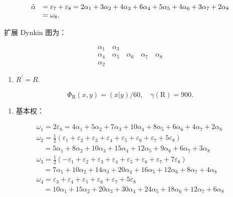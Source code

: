 \[
\begin{array}{r l} \tilde {\alpha} & = \varepsilon_ {7} + \varepsilon_ {8} = 2 \alpha_ {1} + 3 \alpha_ {2} + 4 \alpha_ {3} + 6 \alpha_ {4} + 5 \alpha_ {5} + 4 \alpha_ {6} + 3 \alpha_ {7} + 2 \alpha_ {8} \\ & = \omega_ {8}. \end{array}
\]

扩展 Dynkin 图为：

\[
\begin{array}{c} \alpha_ {1} \quad \alpha_ {3} \\ \alpha_ {4} \quad \alpha_ {5} \quad \alpha_ {6} \quad \alpha_ {7} \quad \alpha_ {8} \\ \alpha_ {2} \end{array}
\]

\begin{enumerate}
\def\labelenumi{(\Alph{enumi})}
\setcounter{enumi}{21}
\tightlist
\item
  \(R^{\prime} = R.\)
\end{enumerate}

\[
  \Phi_ {\mathrm{R}} (x, y) = (x | y) / 60, \quad \gamma (\mathrm{R}) = 900.
\]

\begin{enumerate}
\def\labelenumi{(\Roman{enumi})}
\setcounter{enumi}{5}
\tightlist
\item
  基本权：
\end{enumerate}

\[
\begin{array}{l} \omega_ {1} = 2 \varepsilon_ {8} = 4 \alpha_ {1} + 5 \alpha_ {2} + 7 \alpha_ {3} + 10 \alpha_ {4} + 8 \alpha_ {5} + 6 \alpha_ {6} + 4 \alpha_ {7} + 2 \alpha_ {8} \\ \omega_ {2} = \frac {1}{2} (\varepsilon_ {1} + \varepsilon_ {2} + \varepsilon_ {3} + \varepsilon_ {4} + \varepsilon_ {5} + \varepsilon_ {6} + \varepsilon_ {7} + 5 \varepsilon_ {8}) \\ \quad = 5 \alpha_ {1} + 8 \alpha_ {2} + 10 \alpha_ {3} + 15 \alpha_ {4} + 12 \alpha_ {5} + 9 \alpha_ {6} + 6 \alpha_ {7} + 3 \alpha_ {8} \\ \omega_ {3} = \frac {1}{2} (- \varepsilon_ {1} + \varepsilon_ {2} + \varepsilon_ {3} + \varepsilon_ {4} + \varepsilon_ {5} + \varepsilon_ {6} + \varepsilon_ {7} + 7 \varepsilon_ {8}) \\ \quad = 7 \alpha_ {1} + 10 \alpha_ {2} + 14 \alpha_ {3} + 20 \alpha_ {4} + 16 \alpha_ {5} + 12 \alpha_ {6} + 8 \alpha_ {7} + 4 \alpha_ {8} \\ \omega_ {4} = \varepsilon_ {3} + \varepsilon_ {4} + \varepsilon_ {5} + \varepsilon_ {6} + \varepsilon_ {7} + 5 \varepsilon_ {8} \\ \quad = 10 \alpha_ {1} + 15 \alpha_ {2} + 20 \alpha_ {3} + 30 \alpha_ {4} + 24 \alpha_ {5} + 18 \alpha_ {6} + 12 \alpha_ {7} + 6 \alpha_ {8} \end{array}
\]

